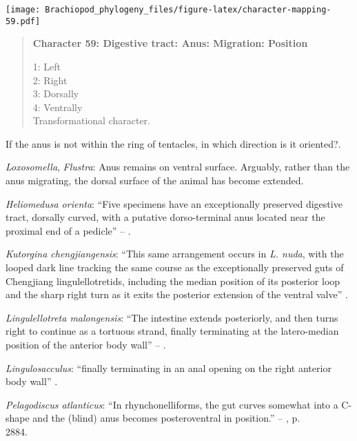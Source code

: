 \documentclass[openany]{book}
\theoremstyle{definition}
\theoremstyle{definition}
\theoremstyle{definition}
\theoremstyle{remark}
\begin{document}
\texttt{[image: Brachiopod\_phylogeny\_files/figure-latex/character-mapping-59.pdf]}

\begin{quote}
\textbf{Character 59: Digestive tract: Anus: Migration: Position}

1: Left\\
2: Right\\
3: Dorsally\\
4: Ventrally\\
Transformational character.
\end{quote}

If the anus is not within the ring of tentacles, in which direction is
it oriented?.

\hypertarget{Flustra-coding-59}{}
\emph{Loxosomella}, \emph{Flustra}: Anus remains on ventral surface.
Arguably, rather than the anus migrating, the dorsal surface of the
animal has become extended.

\hypertarget{Heliomedusa_orienta-coding-59}{}
\emph{Heliomedusa orienta}: ``Five specimens have an exceptionally
preserved digestive tract, dorsally curved, with a putative
dorso-terminal anus located near the proximal end of a pedicle'' --
\citet{Zhang2007Rhynchonelliformeanbrachiopods}.

\hypertarget{Kutorgina_chengjiangensis-coding-59}{}
\emph{Kutorgina chengjiangensis}: ``This same arrangement occurs in
\emph{L. nuda}, with the looped dark line tracking the same course as
the exceptionally preserved guts of Chengjiang lingulellotretids,
including the median position of its posterior loop and the sharp right
turn as it exits the posterior extension of the ventral valve''
\citep[p.310]{Balthasar2009EarlyCambrian}.

\hypertarget{Lingulellotreta_malongensis-coding-59}{}
\emph{Lingulellotreta malongensis}: ``The intestine extends posteriorly,
and then turns right to continue as a tortuous strand, finally
terminating at the latero-median position of the anterior body wall'' --
\citet{Zhang2007Agregarious}.

\hypertarget{Lingulosacculus-coding-59}{}
\emph{Lingulosacculus}: ``finally terminating in an anal opening on the
right anterior body wall'' \citep[p.66]{Zhang2007Noteon}.

\hypertarget{Pelagodiscus_atlanticus-coding-59}{}
\emph{Pelagodiscus atlanticus}: ``In rhynchonelliforms, the gut curves
somewhat into a C-shape and the (blind) anus becomes posteroventral in
position.'' -- \citet{Williams2007Supplement}, p.\\
2884.
\end{document}
